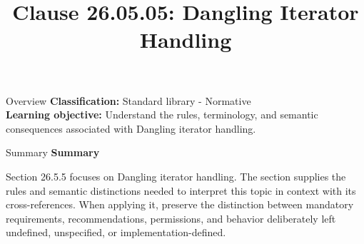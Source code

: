 \documentclass[10pt,letterpaper]{article}
\title{Clause 26.05.05: Dangling Iterator Handling}
\author{}
\date{}
\begin{document}
\maketitle
\begin{CornellOverviewBox}{Overview}
\textbf{Classification:} Standard library - Normative\\[2pt]
\textbf{Learning objective:} Understand the rules, terminology, and semantic consequences associated with Dangling iterator handling.
\end{CornellOverviewBox}\begin{CornellSummaryBox}{Summary}
{\sffamily\bfseries\color{Accent} Summary}\par\vspace{3pt}Section 26.5.5 focuses on Dangling iterator handling. The section supplies the rules and semantic distinctions needed to interpret this topic in context with its cross-references. When applying it, preserve the distinction between mandatory requirements, recommendations, permissions, and behavior deliberately left undefined, unspecified, or implementation-defined.
\end{CornellSummaryBox}
\end{document}
